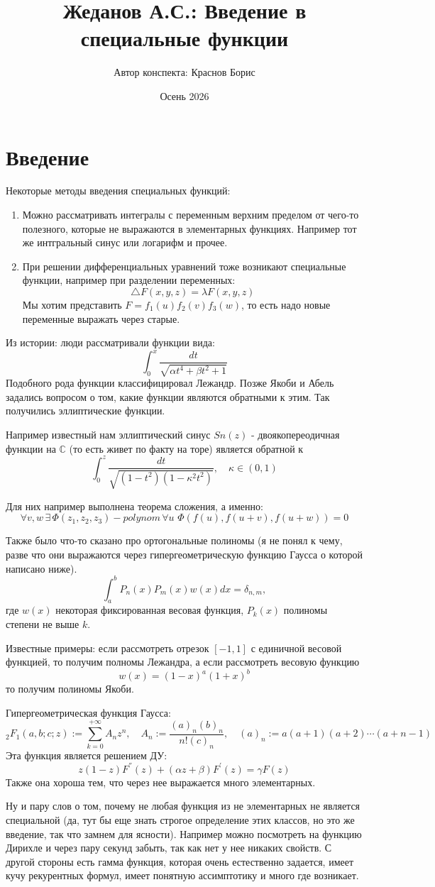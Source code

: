 \documentclass[12pt,a4paper]{article} %
\author{Автор конспекта: Краснов Борис} %
\title{Жеданов А.С.: Введение в специальные функции} %
\date{Осень 2026} %
\newcommand{\Co}{\mathbb{C}}
\begin{document}
	\maketitle
	\tableofcontents
	\clearpage
	
	\section{Введение}
	Некоторые методы введения специальных функций:
	\begin{enumerate}
		\item Можно рассматривать интегралы с переменным верхним пределом от чего-то полезного, которые не выражаются в элементарных функциях. Например тот же интгральный синус или логарифм и прочее.
		\item При решении дифференциальных уравнений тоже возникают специальные функции, например при разделении переменных:
		$$\triangle F(x,y,z)=\lambda F(x,y,z)$$
		Мы хотим представить $F=f_1(u)f_2(v)f_3(w)$, то есть надо новые переменные выражать через старые.
	\end{enumerate}
	
	Из истории: люди рассматривали функции вида:
	$$\int_0^x\frac{dt}{\sqrt{\alpha t^4+\beta t^2+1}}$$
	Подобного рода функции классифицировал Лежандр. Позже Якоби и Абель задались вопросом о том, какие функции являются обратными к этим. Так получились эллиптические функции.
	
	Например известный нам эллиптический синус $Sn(z)$ - двоякопереодичная функции на $\Co$ (то есть живет по факту на торе) является обратной к
	$$\int_0^z\frac{dt}{\sqrt{(1-t^2)(1-\kappa^2t^2)}},\quad\kappa\in(0,1)$$
	
	Для них например выполнена теорема сложения, а именно:
	$$\forall v,w\,\exists\,\Phi(z_1,z_2,z_3)-polynom\,\forall u\,\,\Phi(f(u),f(u+v),f(u+w))=0$$
	
	Также было что-то сказано про ортогональные полиномы (я не понял к чему, разве что они выражаются через гипергеометрическую функцию Гаусса о которой написано ниже).
	$$\int_a^bP_n(x)P_m(x)w(x)dx=\delta_{n,m},$$
	где $w(x)$ некоторая фиксированная весовая функция, $P_k(x)$ полиномы степени не выше $k$.
	
	Известные примеры: если рассмотреть отрезок $[-1,1]$ с единичной весовой функцией, то получим полномы Лежандра, а если рассмотреть весовую функцию
	$$w(x)=(1-x)^a(1+x)^b$$
	то получим полиномы Якоби.
	
	Гипергеометрическая функция Гаусса:
	$$_2F_1(a,b;c;z):=\sum_{k=0}^{+\infty}A_nz^n,\quad A_n:=\frac{(a)_n(b)_n}{n!(c)_n},\quad (a)_n:=a(a+1)(a+2)\cdots(a+n-1)$$
	Эта функция является решением ДУ:
	$$z(1-z)F^{''}(z)+(\alpha z+\beta)F^{'}(z)=\gamma F(z)$$
	Также она хороша тем, что через нее выражается много элементарных.
	
	Ну и пару слов о том, почему не любая функция из не элементарных не является специальной (да, тут бы еще знать строгое определение этих классов, но это же введение, так что замнем для ясности). Например можно посмотреть на функцию Дирихле и через пару секунд забыть, так как нет у нее никаких свойств. С другой стороны есть гамма функция, которая очень естественно задается, имеет кучу рекурентных формул, имеет понятную ассимптотику и много где возникает.
\end{document}
